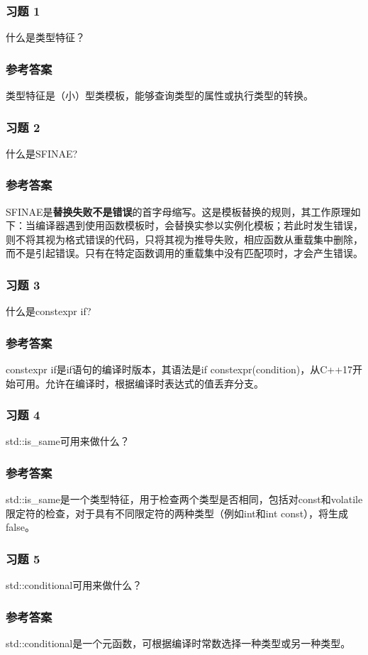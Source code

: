 \subsubsection{习题 1}

什么是类型特征？

\subsubsection{参考答案}

类型特征是（小）型类模板，能够查询类型的属性或执行类型的转换。


\subsubsection{习题 2}

什么是SFINAE?

\subsubsection{参考答案}

SFINAE是\textbf{替换失败不是错误}的首字母缩写。这是模板替换的规则，其工作原理如下：当编译器遇到使用函数模板时，会替换实参以实例化模板；若此时发生错误，则不将其视为格式错误的代码，只将其视为推导失败，相应函数从重载集中删除，而不是引起错误。只有在特定函数调用的重载集中没有匹配项时，才会产生错误。

\subsubsection{习题 3}

什么是constexpr if?

\subsubsection{参考答案}

constexpr if是if语句的编译时版本，其语法是if constexpr(condition)，从C++17开始可用。允许在编译时，根据编译时表达式的值丢弃分支。

\subsubsection{习题 4}

std::is_same可用来做什么？

\subsubsection{参考答案}

std::is_same是一个类型特征，用于检查两个类型是否相同，包括对const和volatile限定符的检查，对于具有不同限定符的两种类型（例如int和int const），将生成false。

\subsubsection{习题 5}

std::conditional可用来做什么？

\subsubsection{参考答案}

std::conditional是一个元函数，可根据编译时常数选择一种类型或另一种类型。












